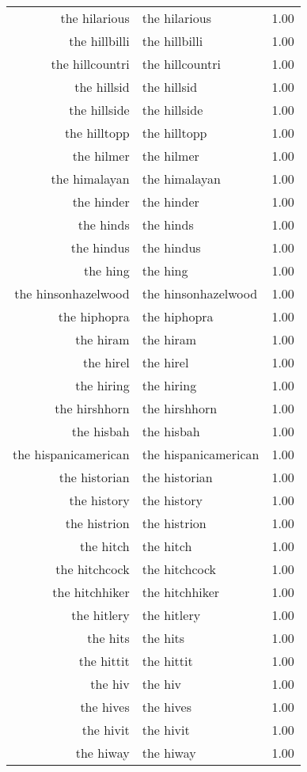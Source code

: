 \begin{table}[ht]
\begin{tabular}{rlr}
  the hilarious & the hilarious & 1.00 \\ 
  the hillbilli & the hillbilli & 1.00 \\ 
  the hillcountri & the hillcountri & 1.00 \\ 
  the hillsid & the hillsid & 1.00 \\ 
  the hillside & the hillside & 1.00 \\ 
  the hilltopp & the hilltopp & 1.00 \\ 
  the hilmer & the hilmer & 1.00 \\ 
  the himalayan & the himalayan & 1.00 \\ 
  the hinder & the hinder & 1.00 \\ 
  the hinds & the hinds & 1.00 \\ 
  the hindus & the hindus & 1.00 \\ 
  the hing & the hing & 1.00 \\ 
  the hinsonhazelwood & the hinsonhazelwood & 1.00 \\ 
  the hiphopra & the hiphopra & 1.00 \\ 
  the hiram & the hiram & 1.00 \\ 
  the hirel & the hirel & 1.00 \\ 
  the hiring & the hiring & 1.00 \\ 
  the hirshhorn & the hirshhorn & 1.00 \\ 
  the hisbah & the hisbah & 1.00 \\ 
  the hispanicamerican & the hispanicamerican & 1.00 \\ 
  the historian & the historian & 1.00 \\ 
  the history & the history & 1.00 \\ 
  the histrion & the histrion & 1.00 \\ 
  the hitch & the hitch & 1.00 \\ 
  the hitchcock & the hitchcock & 1.00 \\ 
  the hitchhiker & the hitchhiker & 1.00 \\ 
  the hitlery & the hitlery & 1.00 \\ 
  the hits & the hits & 1.00 \\ 
  the hittit & the hittit & 1.00 \\ 
  the hiv & the hiv & 1.00 \\ 
  the hives & the hives & 1.00 \\ 
  the hivit & the hivit & 1.00 \\ 
  the hiway & the hiway & 1.00 \\ 

\end{tabular}
\end{table}
